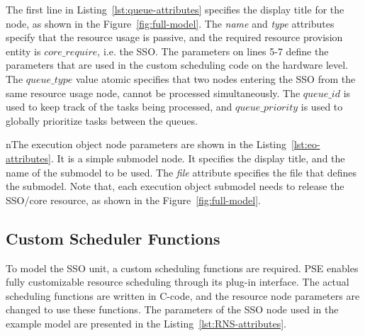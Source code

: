 The first line in Listing~\ref{lst:queue-attributes} specifies the display title for the node, as shown in the Figure~\ref{fig:full-model}. The \emph{name} and \emph{type} attributes specify that the resource usage is passive, and the required resource provision entity is $core\_require$, i.e. the SSO. The parameters on lines 5-7 define the parameters that are used in the custom scheduling code on the hardware level. The \emph{$queue\_type$} value atomic specifies that two nodes entering the SSO from the same resource usage node, cannot be processed simultaneously. The \emph{$queue\_id$} is used to keep track of the tasks being processed, and \emph{$queue\_priority$} is used to globally prioritize tasks between the queues.



nThe execution object node parameters are shown in the Listing~\ref{lst:eo-attributes}. It is a simple submodel node. It specifies the display title, and the name of the submodel to be used. The \emph{file} attribute specifies the file that defines the submodel. Note that, each execution object submodel needs to release the SSO/core resource, as shown in the Figure~\ref{fig:full-model}.

\subsection{Custom Scheduler Functions}
\label{sec:custom-scheduler-functions}



To model the SSO unit, a custom scheduling functions are required. PSE enables fully customizable resource scheduling through its plug-in interface. The actual scheduling functions are written in C-code, and the resource node parameters are changed to use these functions. The parameters of the SSO node used in the example model are presented in the Listing~\ref{lst:RNS-attributes}.

